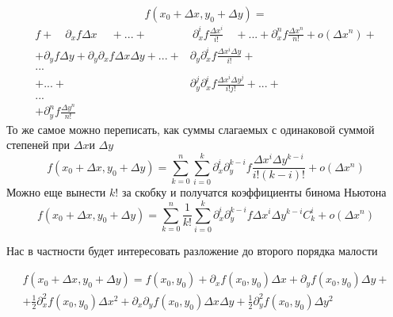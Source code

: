 \documentclass[a4paper,12pt]{article}
\renewcommand{\d}[2][ ]{%
\partial^{#1}_{#2}}
\begin{document}
    \[ f(x_0 + \Delta x, y_0 + \Delta y) = \]
\begin{equation*}
    \begin{split}
            f + \quad \d{x}f \Delta x \quad \  + ... + &\ \d[i]{x}f\frac{\Delta x^i}{i!} \quad +... + \d[n]{x}f\frac{ \Delta x^n}{n!} + o(\Delta x^n) + \\
            +\d{y}f\Delta y +\d{y}\d{x}f \Delta x\Delta y + ... +& \d{y}\d[i]{x}f\frac{\Delta x^i \Delta y}{i!} +\\
            ... \quad\\
                + ... +& \d[j]{y}\d[i]{x}f\frac{\Delta x^i \Delta y^j}{i!j!} + ... +      \\
            ... \\
            +\d[n]{y}f\frac{\Delta y^n}{n!} \qquad\qquad\qquad\qquad\quad &
    \end{split}
\end{equation*}
То же самое можно переписать, как суммы слагаемых с одинаковой суммой степеней при $\Delta x$и $\Delta y$
\begin{equation*}
    f(x_0 + \Delta x, y_0 + \Delta y) =
    \sum_{k=0}^n \sum_{i=0}^k \d[i]{x}\d[k-i]{y}f\frac{\Delta x^i \Delta y^{k-i}}{i!(k-i)!} + o(\Delta x^n)  
\end{equation*}
Можно еще вынести $k!$ за скобку и получатся коэффициенты бинома Ньютона
\begin{equation*}
    f(x_0 + \Delta x, y_0 + \Delta y) =
    \sum_{k=0}^n \frac{1}{k!}\sum_{i=0}^k \d[i]{x}\d[k-i]{y}f\Delta x^i \Delta y^{k-i}C_k^i + o(\Delta x^n)  
\end{equation*}

Нас в частности будет интересовать разложение до второго порядка малости

\begin{equation*}
    \begin{split}
        f(x_0 + \Delta x, y_0 + \Delta y) =
        f(x_0, y_0) + \d{x}f(x_0, y_0)\Delta x + \d{y}f(x_0, y_0)\Delta y + \\
        + \frac{1}{2}\d[2]{x}f(x_0, y_0)\Delta x^2 + \d{x}\d{y}f(x_0, y_0)\Delta x \Delta y + \frac{1}{2}\d[2]{y}f(x_0, y_0)\Delta y^2
    \end{split}
\end{equation*}
\end{document}
